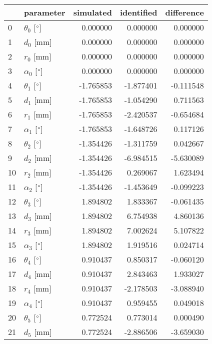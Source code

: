 \documentclass{standalone}%
\begin{document}
%
\normalsize%
\begin{tabular}{llrrr}
\toprule
{} &                 parameter & simulated & identified & difference \\
\midrule
0  &  $\theta_{0}$ [$\degree$] &  0.000000 &   0.000000 &   0.000000 \\
1  &              $d_{0}$ [mm] &  0.000000 &   0.000000 &   0.000000 \\
2  &              $r_{0}$ [mm] &  0.000000 &   0.000000 &   0.000000 \\
3  &  $\alpha_{0}$ [$\degree$] &  0.000000 &   0.000000 &   0.000000 \\
4  &  $\theta_{1}$ [$\degree$] & -1.765853 &  -1.877401 &  -0.111548 \\
5  &              $d_{1}$ [mm] & -1.765853 &  -1.054290 &   0.711563 \\
6  &              $r_{1}$ [mm] & -1.765853 &  -2.420537 &  -0.654684 \\
7  &  $\alpha_{1}$ [$\degree$] & -1.765853 &  -1.648726 &   0.117126 \\
8  &  $\theta_{2}$ [$\degree$] & -1.354426 &  -1.311759 &   0.042667 \\
9  &              $d_{2}$ [mm] & -1.354426 &  -6.984515 &  -5.630089 \\
10 &              $r_{2}$ [mm] & -1.354426 &   0.269067 &   1.623494 \\
11 &  $\alpha_{2}$ [$\degree$] & -1.354426 &  -1.453649 &  -0.099223 \\
12 &  $\theta_{3}$ [$\degree$] &  1.894802 &   1.833367 &  -0.061435 \\
13 &              $d_{3}$ [mm] &  1.894802 &   6.754938 &   4.860136 \\
14 &              $r_{3}$ [mm] &  1.894802 &   7.002624 &   5.107822 \\
15 &  $\alpha_{3}$ [$\degree$] &  1.894802 &   1.919516 &   0.024714 \\
16 &  $\theta_{4}$ [$\degree$] &  0.910437 &   0.850317 &  -0.060120 \\
17 &              $d_{4}$ [mm] &  0.910437 &   2.843463 &   1.933027 \\
18 &              $r_{4}$ [mm] &  0.910437 &  -2.178503 &  -3.088940 \\
19 &  $\alpha_{4}$ [$\degree$] &  0.910437 &   0.959455 &   0.049018 \\
20 &  $\theta_{5}$ [$\degree$] &  0.772524 &   0.773014 &   0.000490 \\
21 &              $d_{5}$ [mm] &  0.772524 &  -2.886506 &  -3.659030 \\

\end{tabular}
\end{document}
